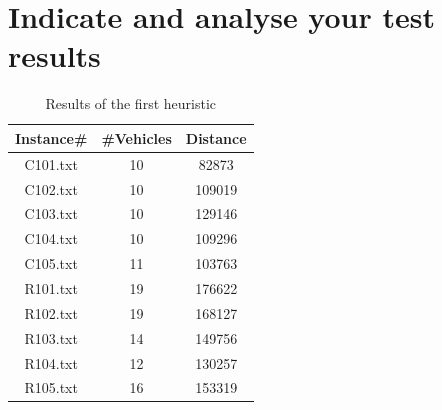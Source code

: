 \documentclass[a4paper ,12pt,french]{article}
\begin{document}
\section{Indicate and analyse your test results}

\begin{table}[!h]
\centering
\begin{tabular}{ | c | c | c |}
\hline
Instance\# & \#Vehicles & Distance \\ 
\hline
 C101.txt & 10 & 82873 \\ 
 C102.txt & 10 & 109019 \\ 
 C103.txt & 10 & 129146 \\ 
 C104.txt & 10 & 109296 \\ 
 C105.txt & 11 & 103763 \\ 
 R101.txt & 19 & 176622 \\ 
 R102.txt & 19 & 168127 \\ 
 R103.txt & 14 & 149756 \\ 
 R104.txt & 12 & 130257 \\ 
 R105.txt & 16 & 153319 \\ 
\hline
\end{tabular}
\caption{Results of the first heuristic}
\end{table}
\end{document}
